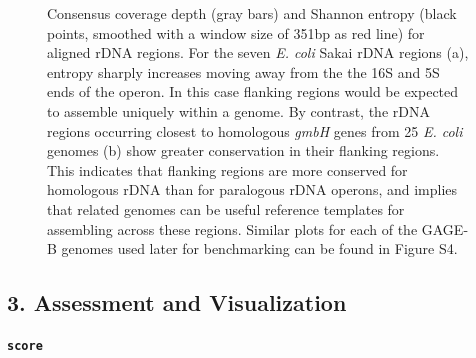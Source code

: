 \documentclass[a4,center,fleqn]{NAR}
\begin{document}
\begin{figure}[!t]
\begin{minipage}{.5\textwidth}
  \end{minipage}%

  \caption{
    Consensus coverage depth (gray bars) and Shannon entropy (black points, smoothed with a window size of 351bp as red line) for aligned rDNA regions. For the seven \textit{E. coli} Sakai rDNA regions (a), entropy sharply increases moving away from the the 16S and 5S ends of the operon. In this case flanking regions would be expected to assemble uniquely within a genome. By contrast, the rDNA regions occurring closest to homologous \textit{gmbH} genes from 25 \textit{E. coli} genomes (b) show greater conservation in their flanking regions. This indicates that flanking regions are more conserved for homologous rDNA than for paralogous rDNA operons, and implies that related genomes can be useful reference templates for assembling across these regions. Similar plots for each of the GAGE-B genomes used later for benchmarking can be found in Figure S4.
  }
  \label{fig:entropy}
\end{figure}

\subsection*{3. Assessment and Visualization}

\textbf{\texttt{score}}\\
\end{document}
